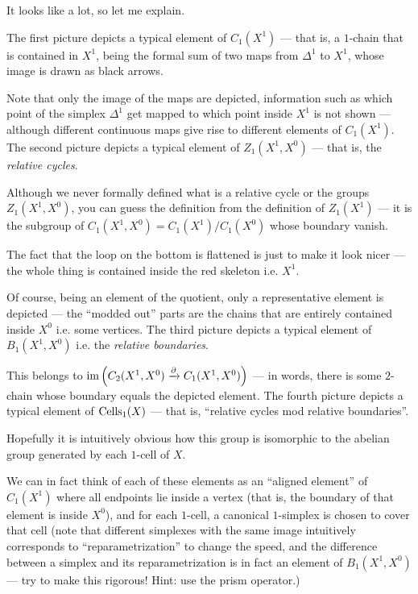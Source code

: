 It looks like a lot, so let me explain.
\begin{itemize}
	\ii The first picture depicts a typical element of $C_1(X^1)$ --- that is, a $1$-chain that is
	contained in $X^1$, being the formal sum of two
	maps from $\Delta^1$ to $X^1$, whose image is drawn as black arrows.

	Note that only the image of the maps are depicted, information such as which point of the
	simplex $\Delta^1$ get mapped to which point inside $X^1$ is not shown --- although different
	continuous maps give rise to different elements of $C_1(X^1)$.
	\ii The second picture depicts a typical element of $Z_1(X^1, X^0)$ --- that is, the
	\emph{relative cycles}.

	Although we never formally defined what is a relative cycle or the groups $Z_1(X^1, X^0)$, you
	can guess the definition from the definition of $Z_1(X^1)$ --- it is the subgroup of
	$C_1(X^1, X^0) = C_1(X^1)/C_1(X^0)$ whose boundary vanish.

	The fact that the loop on the bottom is flattened is just to make it look nicer --- the whole
	thing is contained inside the red skeleton i.e. $X^1$.

	Of course, being an element of the quotient, only a representative element is depicted ---
	the ``modded out'' parts are the chains that are entirely contained inside $X^0$ i.e. some
	vertices.
	\ii The third picture depicts a typical element of $B_1(X^1, X^0)$ i.e. the \emph{relative
	boundaries}.

	This belongs to $\operatorname{im} \left( C_2(X^1, X^0) \xrightarrow{\partial} C_1(X^1, X^0) \right)$ --- in words,
	there is some $2$-chain whose boundary equals the depicted element.
	\ii The fourth picture depicts a typical element of $\operatorname{Cells}_1(X)$ --- that is, ``relative cycles
	mod relative boundaries''.

	Hopefully it is intuitively obvious how this group is isomorphic to the abelian group generated
	by each $1$-cell of $X$.

	We can in fact think of each of these elements as an ``aligned element'' of $C_1(X^1)$
	where all endpoints lie inside a vertex (that is, the boundary of that element is inside $X^0$),
	and for each $1$-cell, a canonical $1$-simplex is chosen to cover that cell (note that different
	simplexes with the same image intuitively corresponds to ``reparametrization'' to change the
	speed, and the difference between a simplex and its reparametrization is in fact
	an element of $B_1(X^1, X^0)$ --- try to make this rigorous! Hint: use the prism operator.)


\end{itemize}
